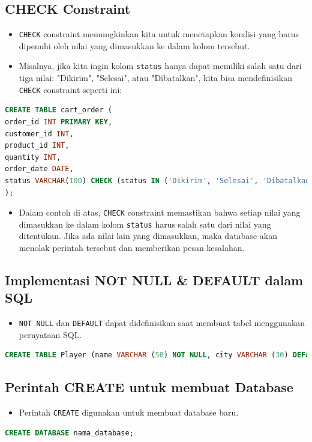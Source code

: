 \documentclass{article}
\begin{document}
\subsection{CHECK Constraint}
\begin{itemize}
    \item \texttt{CHECK} constraint memungkinkan kita untuk menetapkan kondisi yang harus dipenuhi oleh nilai yang dimasukkan ke dalam kolom tersebut.
    \item Misalnya, jika kita ingin kolom \texttt{status} hanya dapat memiliki salah satu dari tiga nilai: "Dikirim", "Selesai", atau "Dibatalkan", kita bisa mendefinisikan \texttt{CHECK} constraint seperti ini:
\end{itemize}
\begin{lstlisting}[language=SQL, caption={Contoh Sintaks CHECK Constraint}, captionpos=b]
CREATE TABLE cart_order (  
order_id INT PRIMARY KEY,  
customer_id INT,  
product_id INT,  
quantity INT,  
order_date DATE,  
status VARCHAR(100) CHECK (status IN ('Dikirim', 'Selesai', 'Dibatalkan'))  
);
\end{lstlisting}
\begin{itemize}
    \item Dalam contoh di atas, \texttt{CHECK} constraint memastikan bahwa setiap nilai yang dimasukkan ke dalam kolom \texttt{status} harus salah satu dari nilai yang ditentukan. Jika ada nilai lain yang dimasukkan, maka database akan menolak perintah tersebut dan memberikan pesan kesalahan.
\end{itemize}

\subsection{Implementasi NOT NULL \& DEFAULT dalam SQL}
\begin{itemize}
    \item \texttt{NOT NULL} dan \texttt{DEFAULT} dapat didefinisikan saat membuat tabel menggunakan pernyataan SQL.
\end{itemize}
\begin{lstlisting}[language=SQL, caption={Contoh Sintaks NOT NULL dan DEFAULT}, captionpos=b]
CREATE TABLE Player (name VARCHAR (50) NOT NULL, city VARCHAR (30) DEFAULT "Barcelona");
\end{lstlisting}

\subsection{Perintah CREATE untuk membuat Database}
\begin{itemize}
    \item Perintah \texttt{CREATE} digunakan untuk membuat database baru.
\end{itemize}
\begin{lstlisting}[language=SQL, caption={Sintaks CREATE DATABASE}, captionpos=b]
CREATE DATABASE nama_database;
\end{lstlisting}
\end{document}
